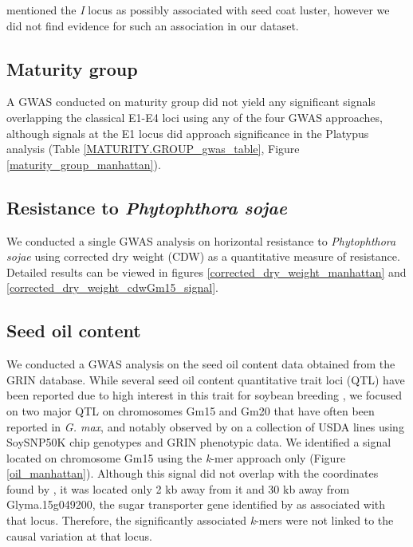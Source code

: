
\cite{bandillo2017} mentioned the \textit{I} locus as possibly associated
with seed coat luster, however we did not find evidence for such an association
in our dataset.

\subsection*{Maturity group}
\label{sv-gwas-maturity-group}

A GWAS conducted on maturity group did not yield any significant signals
overlapping the classical E1-E4 loci using any of the four GWAS approaches,
although signals at the E1 locus did approach significance in the Platypus
analysis (Table \ref{MATURITY.GROUP_gwas_table}, Figure \ref{maturity_group_manhattan}).

\subsection*{Resistance to \emph{Phytophthora sojae}}
\label{sv-gwas-resistance}

We conducted a single GWAS analysis on horizontal resistance to
\textit{Phytophthora sojae} using corrected dry weight (CDW) as a quantitative
measure of resistance. Detailed results can be viewed in figures
\ref{corrected_dry_weight_manhattan} and
\ref{corrected_dry_weight_cdwGm15_signal}.

\subsection*{Seed oil content}
\label{sv-gwas-seed-oil-content}

We conducted a GWAS analysis on the seed oil content data obtained from the
GRIN database. While several seed oil content quantitative trait loci (QTL)
have been reported due to high interest in this trait for soybean breeding
\citep{chaudhary2015}, we focused on two major QTL on chromosomes Gm15 and Gm20
that have often been reported in \emph{G. max}, and notably observed by
\cite{bandillo2015} on a collection of USDA lines using SoySNP50K chip
genotypes and GRIN phenotypic data. We identified a signal located on
chromosome Gm15 using the \emph{k}-mer approach only (Figure
\ref{oil_manhattan}). Although this signal did not overlap with the coordinates
found by \cite{bandillo2017}, it was located only 2 kb away from it and 30 kb
away from Glyma.15g049200, the sugar transporter gene identified by
\cite{zhang2020} as associated with that locus. Therefore, the significantly
associated \emph{k}-mers were not linked to the causal variation at that locus.

